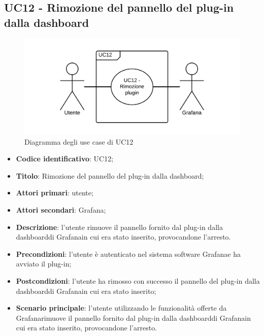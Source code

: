 \subsection{UC12 - Rimozione del pannello del plug-in dalla dashboard}
\begin{figure}[H]
\includegraphics{img/UC12_-_Rimozione_plugin.png}
\caption{Diagramma degli use case di UC12}
\end{figure}
\begin{itemize}
    \item \textbf{Codice identificativo}: UC12;
    \item \textbf{Titolo}: Rimozione del pannello del plug-in dalla dashboard\glo;
    \item \textbf{Attori primari}: utente;
    \item \textbf{Attori secondari}: Grafana\glo;
    \item \textbf{Descrizione}: l'utente rimuove il pannello fornito dal plug-in dalla dashboard\glosp di Grafana\glosp in cui era stato inserito, provocandone l'arresto.
    \item \textbf{Precondizioni}: l'utente è autenticato nel sistema software Grafana\glosp e ha avviato il plug-in;
    \item \textbf{Postcondizioni}: l'utente ha rimosso con successo il pannello del plug-in dalla dashboard\glosp di Grafana\glo in cui era stato inserito;
    \item \textbf{Scenario principale}: l'utente utilizzando le funzionalità offerte da Grafana\glosp rimuove il pannello fornito dal plug-in dalla dashboard\glosp di Grafana\glosp in cui era stato inserito, provocandone l'arresto.
\end{itemize}

